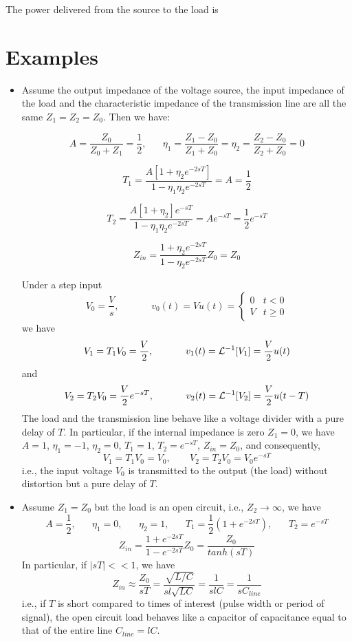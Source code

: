 The power delivered from the source to the load is


\section*{Examples}

\begin{itemize}
\item Assume the output impedance of the voltage source, the input impedance 
  of the load and the characteristic impedance of the transmission line are 
  all the same $Z_1=Z_2=Z_0$. Then we have:

\[ A=\frac{Z_0}{Z_0+Z_1}=\frac{1}{2},\;\;\;\;\;\;
\eta_1=\frac{Z_1-Z_0}{Z_1+Z_0}
=\eta_2=\frac{Z_2-Z_0}{Z_2+Z_0}=0 \]

\[ T_1=\frac{A[1+\eta_2e^{-2sT}]}{1-\eta_1\eta_2e^{-2sT}}=A=\frac{1}{2}	\]

\[ T_2=\frac{A[1+\eta_2]e^{-sT}}{1-\eta_1\eta_2e^{-2sT}}=Ae^{-sT}=\frac{1}{2}e^{-sT}	\]

\[ Z_{in}=\frac{1+\eta_2e^{-2sT}}{1-\eta_2e^{-2sT}}Z_0=Z_0 \]

Under a step input 
\[	V_0=\frac{V}{s},\;\;\;\;\;\;\;\;\;\;\;\;
        v_0(t)=V u(t)=\left\{ \begin{array}{ll}0 & t<0 \\ V & t \ge 0 \end{array} \right. \]
we have
\[	V_1=T_1V_0=\frac{V}{2},\;\;\;\;\;\;\;\;\;\;\;\;
	v_1(t)={\cal L}^{-1}[V_1]=\frac{V}{2}u(t)	\]
and
\[	V_2=T_2V_0=\frac{V}{2}e^{-sT},\;\;\;\;\;\;\;\;\;\;\;\;
	v_2(t)={\cal L}^{-1}[V_2]=\frac{V}{2}u(t-T)	\]
The load and the transmission line behave like a voltage divider with
a pure delay of $T$. In particular, if the internal impedance is zero
$Z_1=0$, we have $A=1$, $\eta_1=-1$, $\eta_2=0$, $T_1=1$,
$T_2=e^{-sT}$, $Z_{in}=Z_0$, and consequently, 
\[	V_1=T_1V_0=V_0,\;\;\;\;\;\;\;V_2=T_2V_0=V_0e^{-sT}	\]
i.e., the input voltage $V_0$ is transmitted to the output (the 
load) without distortion but a pure delay of $T$. 

\item Assume $Z_1=Z_0$ but the load is an open circuit, i.e., 
$Z_2\rightarrow \infty$, we have
\[	A=\frac{1}{2},\;\;\;\;\;\;\eta_1=0,\;\;\;\;\;\;\eta_2=1,
\;\;\;\;\;\;T_1=\frac{1}{2}(1+e^{-2sT}),\;\;\;\;\;\;T_2=e^{-sT}	\]
\[ Z_{in}=\frac{1+e^{-2sT}}{1-e^{-2sT}}Z_0=\frac{Z_0}{tanh(sT)} \]
In particular, if $|sT| << 1$, we have
\[ Z_{in}\approx \frac{Z_0}{sT}=\frac{\sqrt{L/C}}{sl\sqrt{LC}}
	=\frac{1}{slC}=\frac{1}{sC_{line}}	\]
i.e., if $T$ is short compared to times of interest (pulse width or
period of signal), the open circuit load behaves like a capacitor of
capacitance equal to that of the entire line $C_{line}=lC$.


\end{itemize}
